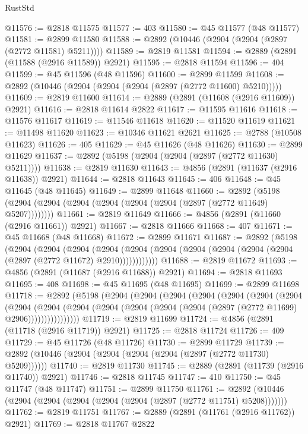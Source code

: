 \begin{lexlean}{RustStd}
\begin{coremodule}
@11576 := @2818 @11575
@11577 := 403
@11580 := @45 @11577 (@48 @11577)
@11581 := @2899 @11580
@11588 := @2892 (@10446 (@2904 (@2904 (@2897 (@2772 @11581) @5211))))
@11589 := @2819 @11581
@11594 := @2889 (@2891 (@11588 (@2916 @11589)) @2921)
@11595 := @2818 @11594
@11596 := 404
@11599 := @45 @11596 (@48 @11596)
@11600 := @2899 @11599
@11608 := @2892 (@10446 (@2904 (@2904 (@2904 (@2897 (@2772 @11600) @5210)))))
@11609 := @2819 @11600
@11614 := @2889 (@2891 (@11608 (@2916 @11609)) @2921)
@11616 := @2818 @11614 @2822
@11617 := @11595 @11616
@11618 := @11576 @11617
@11619 := @11546 @11618
@11620 := @11520 @11619
@11621 := @11498 @11620
@11623 := @10346 @11621 @2621
@11625 := @2788 (@10508 @11623)
@11626 := 405
@11629 := @45 @11626 (@48 @11626)
@11630 := @2899 @11629
@11637 := @2892 (@5198 (@2904 (@2904 (@2897 (@2772 @11630) @5211))))
@11638 := @2819 @11630
@11643 := @4856 (@2891 (@11637 (@2916 @11638)) @2921)
@11644 := @2818 @11643
@11645 := 406
@11648 := @45 @11645 (@48 @11645)
@11649 := @2899 @11648
@11660 := @2892 (@5198 (@2904 (@2904 (@2904 (@2904 (@2904 (@2904 (@2897 (@2772 @11649) @5207))))))))
@11661 := @2819 @11649
@11666 := @4856 (@2891 (@11660 (@2916 @11661)) @2921)
@11667 := @2818 @11666
@11668 := 407
@11671 := @45 @11668 (@48 @11668)
@11672 := @2899 @11671
@11687 := @2892
    (@5198
      (@2904
        (@2904
          (@2904
            (@2904 (@2904 (@2904 (@2904 (@2904 (@2904 (@2904 (@2897 (@2772 @11672) @2910))))))))))))
@11688 := @2819 @11672
@11693 := @4856 (@2891 (@11687 (@2916 @11688)) @2921)
@11694 := @2818 @11693
@11695 := 408
@11698 := @45 @11695 (@48 @11695)
@11699 := @2899 @11698
@11718 := @2892
    (@5198
      (@2904
        (@2904
          (@2904
            (@2904
              (@2904
                (@2904
                  (@2904
                    (@2904
                      (@2904
                        (@2904
                          (@2904 (@2904 (@2904 (@2904 (@2897 (@2772 @11699) @2906))))))))))))))))
@11719 := @2819 @11699
@11724 := @4856 (@2891 (@11718 (@2916 @11719)) @2921)
@11725 := @2818 @11724
@11726 := 409
@11729 := @45 @11726 (@48 @11726)
@11730 := @2899 @11729
@11739 := @2892 (@10446 (@2904 (@2904 (@2904 (@2904 (@2897 (@2772 @11730) @5209))))))
@11740 := @2819 @11730
@11745 := @2889 (@2891 (@11739 (@2916 @11740)) @2921)
@11746 := @2818 @11745
@11747 := 410
@11750 := @45 @11747 (@48 @11747)
@11751 := @2899 @11750
@11761 := @2892 (@10446 (@2904 (@2904 (@2904 (@2904 (@2904 (@2897 (@2772 @11751) @5208)))))))
@11762 := @2819 @11751
@11767 := @2889 (@2891 (@11761 (@2916 @11762)) @2921)
@11769 := @2818 @11767 @2822

\end{coremodule}
\end{lexlean}
